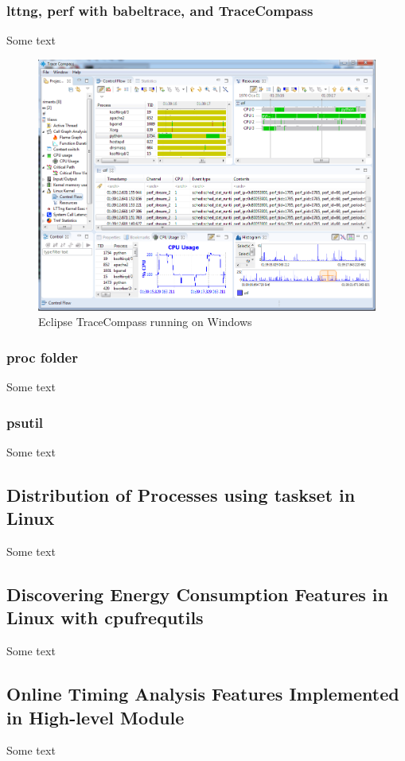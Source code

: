 \subsubsection{lttng, perf with babeltrace, and TraceCompass}
Some text \\
\begin{figure}[!ht]
	\includegraphics[scale=0.45]{content/images/tracecompass.png}
	\caption{Eclipse TraceCompass running on Windows}
	\label{fig:tracecompass}
\end{figure}
\subsubsection{proc folder}
Some text \\
\subsubsection{psutil}
Some text \\
\subsection{Distribution of Processes using taskset in Linux}
Some text \\
\subsection{Discovering Energy Consumption Features in Linux with cpufrequtils}
Some text \\
\subsection{Online Timing Analysis Features Implemented in High-level Module}
Some text \\


